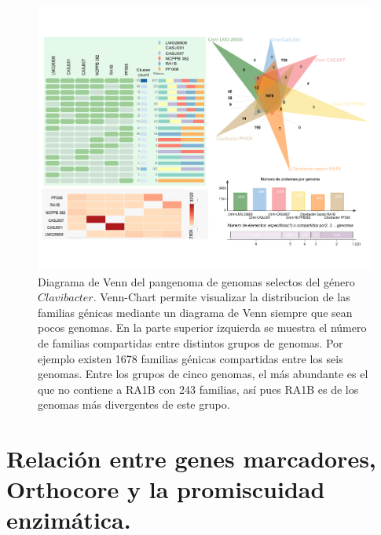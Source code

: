 \documentclass[12pt,twoside]{reedthesis}
\begin{document}
  \begin{figure}[h!tbp]
  \centering
  \includegraphics[angle = 0,scale = .6]{chapter1/Venn_chart.pdf}
  \caption[Diagrama de Venn del pangenoma de genomas selectos del género $Clavibacter$ ]{\footnotesize{Diagrama de Venn del pangenoma de genomas selectos del género $Clavibacter$. Venn-Chart permite visualizar la distribucion de las familias génicas mediante un diagrama de Venn siempre que sean pocos genomas. En la parte superior izquierda se muestra el número de familias compartidas entre distintos grupos de genomas. Por ejemplo existen 1678 familias génicas compartidas entre los seis genomas. Entre los grupos de cinco genomas, el más abundante es el que no contiene a RA1B con 243 familias, así pues RA1B es de los genomas más divergentes de este grupo.}}
  \label{fig:Venn-Chart}
  \end{figure}
  
  \section{Relación entre genes marcadores, Orthocore y la promiscuidad
  enzimática.}\label{relacion-entre-genes-marcadores-orthocore-y-la-promiscuidad-enzimatica.}
  
\end{document}

